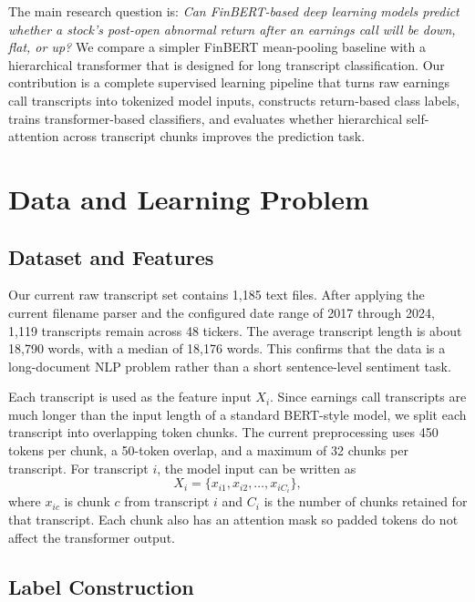 \documentclass[11pt]{article}
\begin{document}
The main research question is: \textit{Can FinBERT-based deep learning models predict whether a stock's post-open abnormal return after an earnings call will be down, flat, or up?} We compare a simpler FinBERT mean-pooling baseline with a hierarchical transformer that is designed for long transcript classification. Our contribution is a complete supervised learning pipeline that turns raw earnings call transcripts into tokenized model inputs, constructs return-based class labels, trains transformer-based classifiers, and evaluates whether hierarchical self-attention across transcript chunks improves the prediction task.

\section{Data and Learning Problem}

\subsection{Dataset and Features}

Our current raw transcript set contains 1,185 text files. After applying the current filename parser and the configured date range of 2017 through 2024, 1,119 transcripts remain across 48 tickers. The average transcript length is about 18,790 words, with a median of 18,176 words. This confirms that the data is a long-document NLP problem rather than a short sentence-level sentiment task.

Each transcript is used as the feature input $X_i$. Since earnings call transcripts are much longer than the input length of a standard BERT-style model, we split each transcript into overlapping token chunks. The current preprocessing uses 450 tokens per chunk, a 50-token overlap, and a maximum of 32 chunks per transcript. For transcript $i$, the model input can be written as
\[
X_i = \{x_{i1}, x_{i2}, \ldots, x_{iC_i}\},
\]
where $x_{ic}$ is chunk $c$ from transcript $i$ and $C_i$ is the number of chunks retained for that transcript. Each chunk also has an attention mask so padded tokens do not affect the transformer output.

\subsection{Label Construction}
\end{document}

